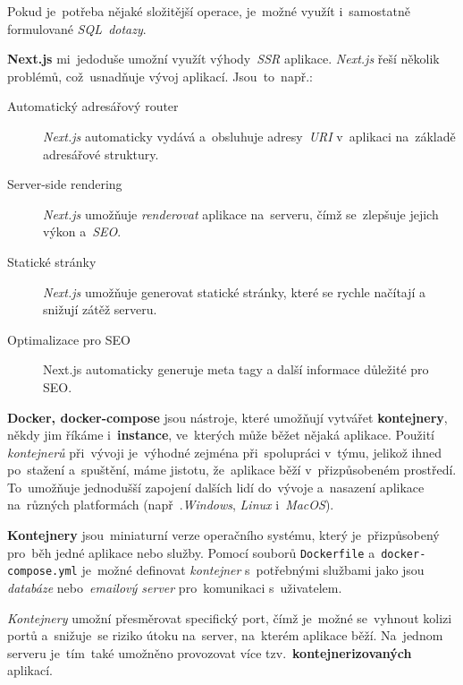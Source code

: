 \documentclass[11pt,a4paper]{report}
\let\oldacrshort\acrshort
\renewcommand{\acrshort}[1]{\emph{\normalsize\color[rgb]{0,0,0}\noindent\oldacrshort{#1}}}
\begin{document}
            Pokud je~potřeba nějaké složitější operace, je~možné využít i~samostatně formulované \emph{SQL~dotazy}. \cite{gormGORM, freecodecamp:orm}

            \textbf{Next.js} mi~jedoduše umožní využít výhody~\acrshort{SSR} aplikace. \emph{Next.js} řeší několik problémů, což~usnadňuje vývoj aplikací. Jsou~to~např.:

            \begin{description}
                \item[Automatický adresářový router] \emph{Next.js} automaticky vydává a~obsluhuje adresy~\acrshort{URI} v~aplikaci na~základě adresářové struktury.
                \item[Server-side rendering] \emph{Next.js} umožňuje \emph{renderovat} aplikace na~serveru, čímž se~zlepšuje jejich výkon a~\acrshort{SEO}.
                \item[Statické stránky] \emph{Next.js} umožňuje generovat statické stránky, které se rychle načítají a snižují zátěž serveru.
                \item[Optimalizace pro SEO] Next.js automaticky generuje meta tagy a další informace důležité pro SEO.
            \end{description}

            \textbf{Docker, docker-compose} jsou nástroje, které umožňují vytvářet \textbf{kontejnery}, někdy jim říkáme i~\textbf{instance}, ve~kterých může běžet nějaká aplikace. Použití \emph{kontejnerů} při~vývoji je~výhodné zejména při~spolupráci v~týmu, jelikož ihned po~stažení a~spuštění, máme jistotu, že~aplikace běží v~přizpůsobeném prostředí. To~umožňuje jednodušší zapojení dalších lidí do~vývoje a~nasazení aplikace na~různých platformách (např~.\emph{Windows}, \emph{Linux} i~\emph{MacOS}).

            \textbf{Kontejnery} jsou~miniaturní verze operačního systému, který je~přizpůsobený pro~běh jedné aplikace nebo služby. Pomocí souborů \texttt{Dockerfile} a~\texttt{docker-compose.yml} je~možné definovat \emph{kontejner} s~potřebnými službami jako jsou \emph{databáze} nebo~\emph{emailový server} pro~komunikaci s~uživatelem.

            \emph{Kontejnery} umožní přesměrovat specifický port, čímž je~možné se~vyhnout kolizi portů a~snižuje~se riziko útoku na~server, na~kterém aplikace běží. Na~jednom serveru je~tím~také umožněno provozovat více tzv.~\textbf{kontejnerizovaných} aplikací. \cite{docker, dockernginxperformance}
\end{document}
